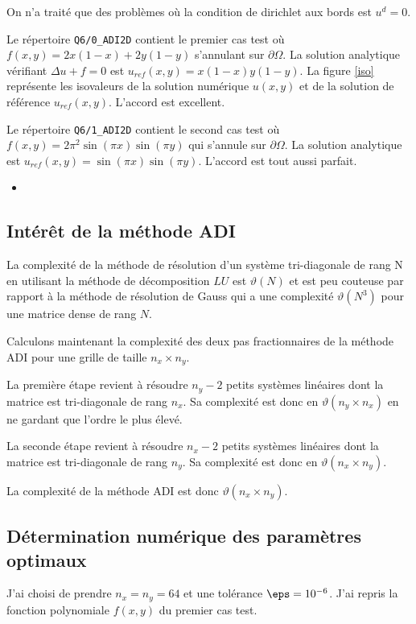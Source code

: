 \documentclass{article}
\newcommand{\gnuscript}[2]
  {\begin{itemize}\item[]\end{itemize}}
\begin{document}
On n'a traité que des problèmes où la condition de dirichlet aux bords est $u^d=0$.

Le répertoire {\tt Q6/0\_ADI2D} contient le premier cas test où
 $f(x,y) = 2x(1-x) + 2y(1-y)$ s'annulant sur $\partial \Omega$. La solution analytique
vérifiant $\Delta u +f =0$ est $u_{ref}(x,y) = x(1-x) y(1-y)$.
La figure \ref{iso} représente les isovaleurs de la solution numérique $u(x,y)$ et de la solution de référence $u_{ref}(x,y)$. L'accord est excellent.

Le répertoire {\tt Q6/1\_ADI2D} contient le second cas test où
 $f(x,y) = 2 \pi^2 \sin(\pi x) \sin(\pi y)$ qui s'annule sur $\partial \Omega$. La solution analytique
est $u_{ref}(x,y) = \sin(\pi x) \sin(\pi y)$. L'accord est tout aussi parfait.

\gnuscript{iso}{Script gnuplot pour visualiser les isovaleurs}

\subsection{Intérêt de la méthode ADI}

La complexité de la méthode de résolution d'un système tri-diagonale de rang N en utilisant la méthode de décomposition $LU$ est $\vartheta(N)$ et est peu couteuse  par rapport à la méthode
de résolution de Gauss qui a une complexité $\vartheta(N^3)$  pour une matrice dense de rang $N$.

Calculons maintenant la complexité des deux pas fractionnaires de la méthode ADI pour une
grille de taille $n_x \times n_y$.

La première étape revient à résoudre $n_y-2$ petits systèmes linéaires dont la matrice est tri-diagonale de rang $n_x$.
Sa complexité est donc en $\vartheta(n_y \times n_x)$ en ne gardant que l'ordre le plus élevé.

La seconde étape revient à résoudre $n_x-2$ petits systèmes linéaires dont la matrice est tri-diagonale de rang $n_y$.
Sa complexité est donc en $\vartheta(n_x \times n_y)$.

La complexité de la méthode ADI est donc $\vartheta(n_x \times n_y)$.

\subsection{Détermination numérique des paramètres optimaux}

J'ai choisi de prendre $n_x=n_y=64$ et une tolérance $\eps=10^{-6}$.
J'ai repris la fonction polynomiale $f(x,y)$ du premier cas test.
\end{document}

